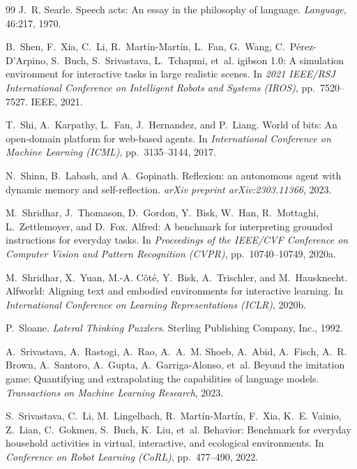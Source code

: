 \begin{thebibliography}{99}
J.~R. Searle.
\newblock Speech acts: An essay in the philosophy of language.
\newblock \emph{Language}, 46:217, 1970.

B.~Shen, F.~Xia, C.~Li, R.~Mart\'in-Mart\'in, L.~Fan, G.~Wang,
C.~P\'erez-D'Arpino, S.~Buch, S.~Srivastava, L.~Tchapmi, et~al.
\newblock igibson 1.0: A simulation environment for interactive tasks in
large realistic scenes.
\newblock In \emph{2021 IEEE/RSJ International Conference on Intelligent
Robots and Systems (IROS)}, pp.\ 7520--7527. IEEE, 2021.

T.~Shi, A.~Karpathy, L.~Fan, J.~Hernandez, and P.~Liang.
\newblock World of bits: An open-domain platform for web-based agents.
\newblock In \emph{International Conference on Machine Learning (ICML)},
pp.\ 3135--3144, 2017.

N.~Shinn, B.~Labash, and A.~Gopinath.
\newblock Reflexion: an autonomous agent with dynamic memory and
self-reflection.
\newblock \emph{arXiv preprint arXiv:2303.11366}, 2023.

M.~Shridhar, J.~Thomason, D.~Gordon, Y.~Bisk, W.~Han, R.~Mottaghi,
L.~Zettlemoyer, and D.~Fox.
\newblock Alfred: A benchmark for interpreting grounded instructions for
everyday tasks.
\newblock In \emph{Proceedings of the IEEE/CVF Conference on Computer
Vision and Pattern Recognition (CVPR)}, pp.\ 10740--10749, 2020a.

M.~Shridhar, X.~Yuan, M.-A. C\^ot\'e, Y.~Bisk, A.~Trischler, and
M.~Hausknecht.
\newblock Alfworld: Aligning text and embodied environments for interactive
learning.
\newblock In \emph{International Conference on Learning Representations
(ICLR)}, 2020b.

P.~Sloane.
\newblock \emph{Lateral Thinking Puzzlers}.
\newblock Sterling Publishing Company, Inc., 1992.

A.~Srivastava, A.~Rastogi, A.~Rao, A.~A.~M. Shoeb, A.~Abid, A.~Fisch,
A.~R. Brown, A.~Santoro, A.~Gupta, A.~Garriga-Alonso, et~al.
\newblock Beyond the imitation game: Quantifying and extrapolating the
capabilities of language models.
\newblock \emph{Transactions on Machine Learning Research}, 2023.

S.~Srivastava, C.~Li, M.~Lingelbach, R.~Mart\'in-Mart\'in, F.~Xia,
K.~E. Vainio, Z.~Lian, C.~Gokmen, S.~Buch, K.~Liu, et~al.
\newblock Behavior: Benchmark for everyday household activities in
virtual, interactive, and ecological environments.
\newblock In \emph{Conference on Robot Learning (CoRL)}, pp.\ 477--490,
2022.


\end{thebibliography}

